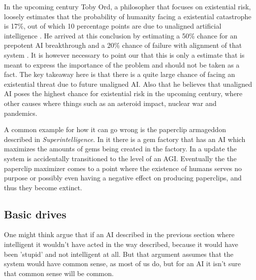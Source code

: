 \documentclass[12pt,A4]{report}
\theoremstyle{definition}
\begin{document}
In the upcoming century Toby Ord, a philosopher that focuses on existential risk, loosely estimates that the probability of humanity facing a existential catastrophe is 17\%, out of which 10 percentage points are due to unaligned artificial intelligence \autocite{precipice}. He arrived at this conclusion by estimating a 50\% chance for an prepotent AI breakthrough and a 20\% chance of failure with alignment of that system \autocite{rationally speaking}. It is however necessary to point our that this is only a estimate that is meant to express the importance of the problem and should not be taken as a fact. The key takeaway here is that there is a quite large chance of facing an existential threat due to future unaligned AI. Also that he believes that unaligned AI poses the highest chance for existential risk in the upcoming century, where other causes where things such as an asteroid impact, nuclear war and pandemics. 

A common example for how it can go wrong is the paperclip armageddon described in \textit{Superintelligence}. In it there is a gem factory that has an AI which maximizes the amounts of gems being created in the factory. In a update the system is accidentally transitioned to the level of an AGI. Eventually the the paperclip maximizer comes to a point where the existence of humans serves no purpose or possibly even having a negative effect on producing paperclips, and thus they become extinct. 

\subsection{Basic drives}
One might think argue that if an AI described in the previous section where intelligent it wouldn't have acted in the way described, because it would have been 'stupid' and not intelligent at all. But that argument assumes that the system would have common sense, as most of us do, but for an AI it isn't sure that common sense will be common. 
\end{document}

